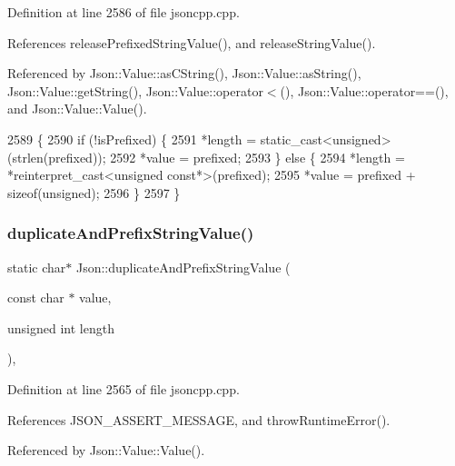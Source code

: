 Definition at line 2586 of file jsoncpp.\+cpp.



References release\+Prefixed\+String\+Value(), and release\+String\+Value().



Referenced by Json\+::\+Value\+::as\+C\+String(), Json\+::\+Value\+::as\+String(), Json\+::\+Value\+::get\+String(), Json\+::\+Value\+::operator$<$(), Json\+::\+Value\+::operator==(), and Json\+::\+Value\+::\+Value().


\begin{DoxyCode}
2589 \{
2590   \textcolor{keywordflow}{if} (!isPrefixed) \{
2591     *length = \textcolor{keyword}{static\_cast<}\textcolor{keywordtype}{unsigned}\textcolor{keyword}{>}(strlen(prefixed));
2592     *value = prefixed;
2593   \} \textcolor{keywordflow}{else} \{
2594     *length = *\textcolor{keyword}{reinterpret\_cast<}\textcolor{keywordtype}{unsigned} const*\textcolor{keyword}{>}(prefixed);
2595     *value = prefixed + \textcolor{keyword}{sizeof}(unsigned);
2596   \}
2597 \}
\end{DoxyCode}
\mbox{\label{namespace_json_a9795a09a0141d1f12d307c4386aeaee6}} 
\subsubsection{\texorpdfstring{duplicate\+And\+Prefix\+String\+Value()}{duplicateAndPrefixStringValue()}}
{\footnotesize\ttfamily static char$\ast$ Json\+::duplicate\+And\+Prefix\+String\+Value (\begin{DoxyParamCaption}\item[{const char $\ast$}]{value,  }\item[{unsigned int}]{length }\end{DoxyParamCaption})\hspace{0.3cm}{\ttfamily [inline]}, {\ttfamily [static]}}



Definition at line 2565 of file jsoncpp.\+cpp.



References J\+S\+O\+N\+\_\+\+A\+S\+S\+E\+R\+T\+\_\+\+M\+E\+S\+S\+A\+GE, and throw\+Runtime\+Error().



Referenced by Json\+::\+Value\+::\+Value().


